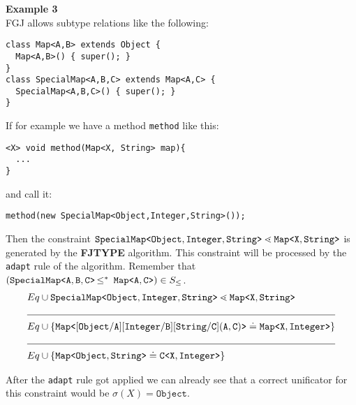 \documentclass[a4paper,USenglish,cleveref, autoref, thm-restate]{lipics-v2021}
\begin{document}
\textbf{Example 3}\\
FGJ allows subtype relations like the following:
\begin{lstlisting}
class Map<A,B> extends Object {
  Map<A,B>() { super(); }
}
class SpecialMap<A,B,C> extends Map<A,C> {
  SpecialMap<A,B,C>() { super(); }
}
\end{lstlisting}

If for example we have a method \texttt{method} like this:
\begin{lstlisting}
<X> void method(Map<X, String> map){
  ...
}
\end{lstlisting}
and call it:
\begin{lstlisting}
method(new SpecialMap<Object,Integer,String>());
\end{lstlisting}

Then the constraint $\mathtt{SpecialMap \texttt{<} Object,Integer,String \texttt{>} } \lessdot \mathtt{Map \texttt{<} X,String \texttt{>} }$
is generated by the \textbf{FJTYPE} algorithm.
This constraint will be processed by the \texttt{adapt} rule of the \unify algorithm.
Remember that $(\mathtt{SpecialMap \texttt{<} A,B,C \texttt{>} } \textrm{$\, \leq^\ast \,$}\  \mathtt{Map \texttt{<} A,C \texttt{>} }) \in S_\leq$.
\begin{align*}
  Eq& \cup \exptype{SpecialMap}{Object,Integer,String} \lessdot \exptype{Map}{X,String} \\
  \cline{1-2} 
  Eq& \cup \set{\exptype{Map}{[ Object / A ][ Integer / B ][ String / C ](A,C)}
  \doteq \exptype{Map}{X,Integer}} \\
  \cline{1-2} 
  Eq& \cup \set{\exptype{Map}{Object,String}
  \doteq \exptype{C}{X, Integer}}
\end{align*}

After the \texttt{adapt} rule got applied we can already see that a correct unificator for this constraint would be
$\sigma(X) = \texttt{Object}$.
\end{document}
